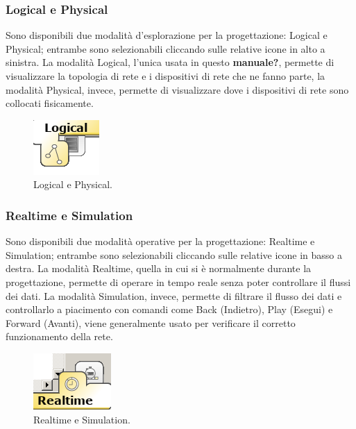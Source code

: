 \subsubsection{Logical e Physical}
Sono disponibili due modalità d'esplorazione per la progettazione: Logical e Physical; entrambe sono selezionabili cliccando sulle relative icone in alto a sinistra. La modalità Logical, l'unica usata in questo \textbf{manuale?}, permette di visualizzare la topologia di rete e i dispositivi di rete che ne fanno parte, la modalità Physical, invece, permette di visualizzare dove i dispositivi di rete sono collocati fisicamente.

\begin{figure}[htbp]
    \centerline{\includegraphics[scale=.6]{images/02.packet-tracer/logical_physical.png}}
    \caption{Logical e Physical.}
\end{figure}

\subsubsection{Realtime e Simulation}
Sono disponibili due modalità operative per la progettazione: Realtime e Simulation; entrambe sono selezionabili cliccando sulle relative icone in basso a destra. La modalità Realtime, quella in cui si è normalmente durante la progettazione, permette di operare in tempo reale senza poter controllare il flussi dei dati. La modalità Simulation, invece, permette di filtrare il flusso dei dati e controllarlo a piacimento con comandi come Back (Indietro), Play (Esegui) e Forward (Avanti), viene generalmente usato per verificare il corretto funzionamento della rete. 

\begin{figure}[htbp]
    \centerline{\includegraphics[scale=.5]{images/02.packet-tracer/realtime_simulation.png}}
    \caption{Realtime e Simulation.}
\end{figure}

